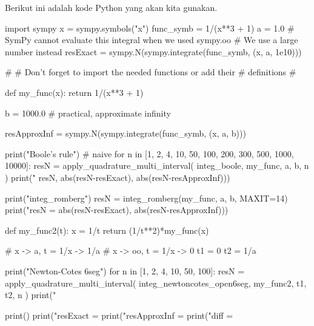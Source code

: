 Berikut ini adalah kode Python yang akan kita gunakan.
\begin{pythoncode}
import sympy
x = sympy.symbols("x")
func_symb = 1/(x**3 + 1)
a = 1.0
# SymPy cannot evaluate this integral when we used sympy.oo
# We use a large number instead
resExact = sympy.N(sympy.integrate(func_symb, (x, a, 1e10)))

#
# Don't forget to import the needed functions or add their
# definitions
#

def my_func(x):
    return 1/(x**3 + 1)

b = 1000.0 # practical, approximate infinity

resApproxInf = sympy.N(sympy.integrate(func_symb, (x, a, b)))

print("\nUsing Boole's rule") # naive
for n in [1, 2, 4, 10, 50, 100, 200, 300, 500, 1000, 10000]:
    resN = apply_quadrature_multi_interval(
        integ_boole, my_func, a, b, n
    )    
    print("%
        resN, abs(resN-resExact), abs(resN-resApproxInf)))

print("\nUsing integ_romberg")
resN = integ_romberg(my_func, a, b, MAXIT=14)
print("resN = %
    abs(resN-resExact), abs(resN-resApproxInf)))

def my_func2(t):
    x = 1/t
    return (1/t**2)*my_func(x)

# x -> a, t = 1/x -> 1/a
# x -> oo, t = 1/x -> 0
t1 = 0
t2 = 1/a

print("\nUsing Newton-Cotes 6seg")
for n in [1, 2, 4, 10, 50, 100]:
    resN = apply_quadrature_multi_interval(
        integ_newtoncotes_open6seg, my_func2, t1, t2, n
    )
    print("%

print()
print("resExact     = %
print("resApproxInf = %
print("diff         = %
\end{pythoncode}


